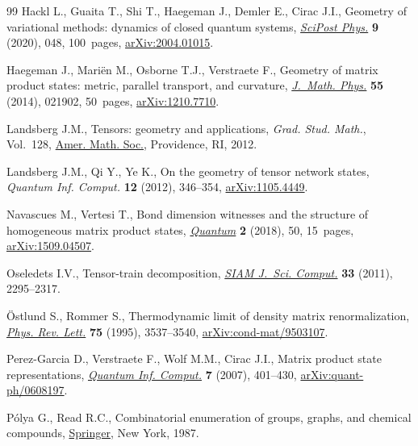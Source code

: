 \documentclass[10pt,a4paper]{amsart}
\numberwithin{equation}{section}
\begin{document}
\begin{thebibliography}{99}
Hackl L., Guaita T., Shi T., Haegeman J., Demler E., Cirac J.I., Geometry of
  variational methods: dynamics of closed quantum systems, \href{https://doi.org/10.21468/scipostphys.9.4.048}{\textit{SciPost
  Phys.}} \textbf{9} (2020), 048, 100~pages, \href{https://arxiv.org/abs/2004.01015}{arXiv:2004.01015}.

Haegeman J., Mari\"en M., Osborne T.J., Verstraete F., Geometry of matrix
  product states: metric, parallel transport, and curvature, \href{https://doi.org/10.1063/1.4862851}{\textit{J.~Math.
  Phys.}} \textbf{55} (2014), 021902, 50~pages, \href{https://arxiv.org/abs/1210.7710}{arXiv:1210.7710}.

Landsberg J.M., Tensors: geometry and applications, \textit{Grad. Stud. Math.},
  Vol.~128, \href{https://doi.org/10.1090/gsm/128}{Amer. Math. Soc.}, Providence, RI, 2012.

Landsberg J.M., Qi Y., Ye K., On the geometry of tensor network states,
  \textit{Quantum Inf. Comput.} \textbf{12} (2012), 346--354,
  \href{https://arxiv.org/abs/:1105.4449}{arXiv:1105.4449}.

Navascues M., Vertesi T., Bond dimension witnesses and the structure of
  homogeneous matrix product states, \href{https://doi.org/10.22331/q-2018-01-31-50}{\textit{Quantum}} \textbf{2} (2018), 50,
  15~pages, \href{https://arxiv.org/abs/1509.04507}{arXiv:1509.04507}.

Oseledets I.V., Tensor-train decomposition, \href{https://doi.org/10.1137/090752286}{\textit{SIAM J.~Sci. Comput.}}
  \textbf{33} (2011), 2295--2317.

\"Ostlund S., Rommer S., Thermodynamic limit of density matrix renormalization,
  \href{https://doi.org/10.1103/PhysRevLett.75.3537}{\textit{Phys. Rev. Lett.}} \textbf{75} (1995), 3537--3540,
  \href{https://arxiv.org/abs/cond-mat/9503107}{arXiv:cond-mat/9503107}.

Perez-Garcia D., Verstraete F., Wolf M.M., Cirac J.I., Matrix product state
  representations, \href{http://hdl.handle.net/1854/LU-8589272}{\textit{Quantum Inf. Comput.}} \textbf{7} (2007), 401--430,
  \href{https://arxiv.org/abs/quant-ph/0608197}{arXiv:quant-ph/0608197}.

P\'olya G., Read R.C., Combinatorial enumeration of groups, graphs, and
  chemical compounds, \href{https://doi.org/10.1007/978-1-4612-4664-0}{Springer}, New York, 1987.


\end{thebibliography}
\end{document}
